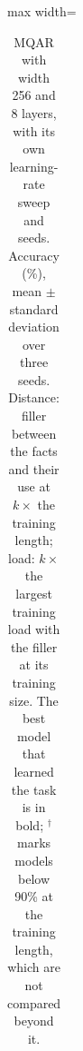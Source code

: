 \begin{table}
\begin{adjustbox}{max width=\linewidth}
\begin{tabular}{lrrrrrrr}
\bottomrule
\end{tabular}
\end{adjustbox}
\caption{MQAR with width 256 and 8 layers, with its own learning-rate sweep and seeds. Accuracy (\%), mean $\pm$ standard deviation over three seeds. Distance: filler between the facts and their use at $k\times$ the training length; load: $k\times$ the largest training load with the filler at its training size. The best model that learned the task is in bold; $^\dagger$ marks models below 90\% at the training length, which are not compared beyond it.}
\label{tab:scale}
\end{table}
